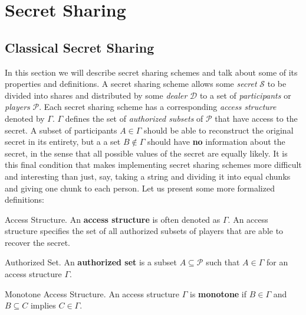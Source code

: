 \chapter{Secret Sharing}
\label{ch:ss}

\section{Classical Secret Sharing}
\label{sec:css}

In this section we will describe secret sharing schemes and talk about some of its properties and definitions. A secret sharing scheme allows some \textit{secret} $\mathcal{S}$ to be divided into shares and distributed by some \textit{dealer} $\mathcal{D}$ to a set of \textit{participants} or \textit{players} $\mathcal{P}$. Each secret sharing scheme has a corresponding \textit{access structure} denoted by $\Gamma$. $\Gamma$ defines the set of \textit{authorized subsets} of $\mathcal{P}$ that have access to the secret. A subset of participants $A \in \Gamma$ should be able to reconstruct the original secret in its entirety, but a a set $B \notin \Gamma$ should have \textbf{no} information about the secret, in the sense that all possible values of the secret are equally likely. It is this final condition that makes implementing secret sharing schemes more difficult and interesting than just, say, taking a string and dividing it into equal chunks and giving one chunk to each person. Let us present some more formalized definitions:

\begin{definition}{Access Structure.}
    \label{defn:access-structure}
    An \textbf{access structure} is often denoted as $\Gamma$. An access structure specifies the set of all authorized subsets of players that are able to recover the secret.
\end{definition}

\begin{definition}{Authorized Set.}
    \label{defn:authorized-set}
    An \textbf{authorized set} is a subset $A \subseteq \mathcal{P}$ such that $A \in \Gamma$ for an access structure $\Gamma$.
\end{definition}

\begin{definition}{Monotone Access Structure.}
    \label{defn:monotone}
    An access structure $\Gamma$ is \textbf{monotone} if $B \in \Gamma$ and $B \subseteq C$ implies $C \in \Gamma$.
\end{definition}

